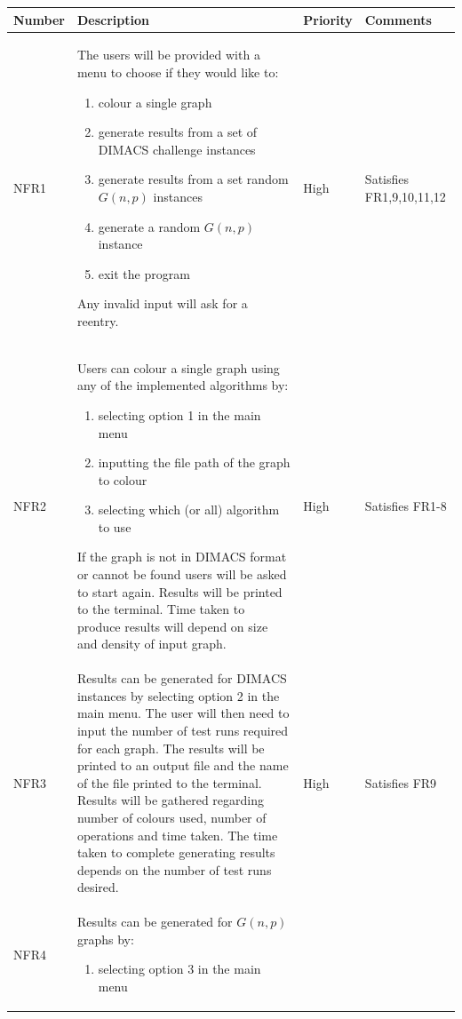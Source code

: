\begin{longtable}{|m{}|m{}|m{}|m{}|}
\hline
\textbf{Number} &  \textbf{Description} & \textbf{Priority} & \textbf{Comments} \\
\hline
NFR1 & The users will be provided with a menu to choose if they would like to: 
        \begin{enumerate}
            \item colour a single graph
            \item generate results from a set of DIMACS challenge instances
            \item generate results from a set random $G(n, p)$ instances
            \item generate a random $G(n, p)$ instance
            \item exit the program
        \end{enumerate}
        Any invalid input will ask for a reentry.
        & High & Satisfies FR1,9,10,11,12  \\
\hline
NFR2 & Users can colour a single graph using any of the implemented algorithms by:
        \begin{enumerate}
            \item selecting option 1 in the main menu
            \item inputting the file path of the graph to colour
            \item selecting which (or all) algorithm to use  
        \end{enumerate}
        If the graph is not in DIMACS format or cannot be found users will be asked to start again.
        Results will be printed to the terminal. Time taken to produce results will depend on size and density of input graph.
        & High & Satisfies FR1-8 \\
\hline
NFR3 & Results can be generated for DIMACS instances by selecting option 2 in the main menu. The user will then need to input the number of test runs required for each graph. The results will be printed to an output file and the name of the file printed to the terminal. Results will be gathered regarding number of colours used, number of operations and time taken. The time taken to complete generating results depends on the number of test runs desired. & High & Satisfies FR9 \\
\hline
NFR4 & Results can be generated for $G(n, p)$ graphs by:
    \begin{enumerate}
        \item selecting option 3 in the main menu

\end{enumerate}
\end{longtable}
